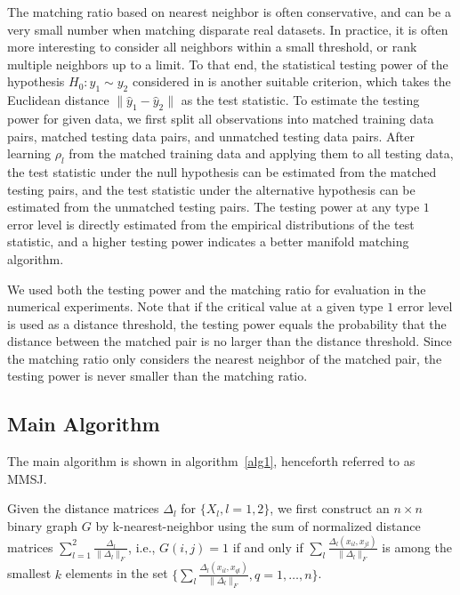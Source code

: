 \documentclass[times,twocolumn,final]{elsarticle}
\begin{document}
The matching ratio based on nearest neighbor is often conservative, and can be a very small number when matching disparate real datasets. In practice, it is often more interesting to consider all neighbors within a small threshold, or rank multiple neighbors up to a limit. To that end, the statistical testing power of the hypothesis $H_{0}: y_{1} \sim y_{2}$ considered in \citep{PriebeMarchette2012} is another suitable criterion, which takes the Euclidean distance $\|\hat{y}_{1}- \hat{y}_{2}\|$ as the test statistic. To estimate the testing power for given data, we first split all observations into matched training data pairs, matched testing data pairs, and unmatched testing data pairs. After learning $\rho_{l}$ from the matched training data and applying them to all testing data, the test statistic under the null hypothesis can be estimated from the matched testing pairs, and the test statistic under the alternative hypothesis can be estimated from the unmatched testing pairs. The testing power at any type $1$ error level is directly estimated from the empirical distributions of the test statistic, and a higher testing power indicates a better manifold matching algorithm. 

We used both the testing power and the matching ratio for evaluation in the numerical experiments. Note that if the critical value at a given type $1$ error level is used as a distance threshold, the testing power equals the probability that the distance between the matched pair is no larger than the distance threshold. Since the matching ratio only considers the nearest neighbor of the matched pair, the testing power is never smaller than the matching ratio.

\subsection{Main Algorithm}
\label{main1}
The main algorithm is shown in algorithm~\ref{alg1}, henceforth referred to as MMSJ. 

Given the distance matrices $\Delta_{l}$ for $\{X_{l}, l=1,2\}$, we first construct an $n \times n$ binary graph $G$ by k-nearest-neighbor using the sum of normalized distance matrices $\sum_{l=1}^{2} \frac{\Delta_{l}}{\|\Delta_{l}\|_{F}}$, i.e., $G(i,j)=1$ if and only if $\sum_{l} \frac{\Delta_{l}(x_{il},x_{jl})}{\|\Delta_{l}\|_{F}}$ is among the smallest $k$ elements in the set $\{ \sum_{l} \frac{\Delta_{l}(x_{il},x_{ql})} {\|\Delta_{l}\|_{F}}, q=1,\ldots,n \}$.
\end{document}
